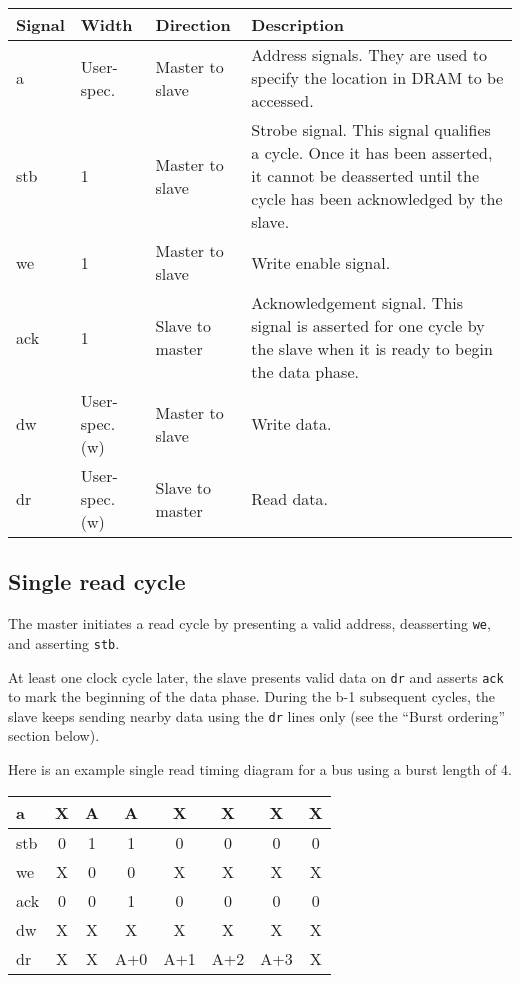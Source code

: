 \documentclass[a4paper,11pt]{article}
\begin{document}
\begin{tabularx}{\textwidth}{|l|l|l|X|}
\hline
\bf{Signal} & \bf{Width} & \bf{Direction} & \bf{Description} \\
\hline
a & User-spec. & Master to slave & Address signals. They are used to specify the location in DRAM to be accessed. \\
\hline
stb & 1 & Master to slave & Strobe signal. This signal qualifies a cycle. Once it has been asserted, it cannot be deasserted until the cycle has been acknowledged by the slave. \\
\hline
we & 1 & Master to slave & Write enable signal. \\
\hline
ack & 1 & Slave to master & Acknowledgement signal. This signal is asserted for one cycle by the slave when it is ready to begin the data phase. \\
\hline
dw & User-spec. (w) & Master to slave & Write data. \\
\hline
dr & User-spec. (w) & Slave to master & Read data. \\
\hline
\end{tabularx}

\subsection{Single read cycle}
The master initiates a read cycle by presenting a valid address, deasserting \verb!we!, and asserting \verb!stb!.

At least one clock cycle later, the slave presents valid data on \verb!dr! and asserts \verb!ack! to mark the beginning of the data phase. During the b-1 subsequent cycles, the slave keeps sending nearby data using the \verb!dr! lines only (see the ``Burst ordering'' section below).

Here is an example single read timing diagram for a bus using a burst length of 4.

\begin{tabular}{|l|c|c|c|c|c|c|c|}
\hline
a & X & A & A & X & X & X & X \\
\hline
stb & 0 & 1 & 1 & 0 & 0 & 0 & 0 \\
\hline
we & X & 0 & 0 & X & X & X & X \\
\hline
ack & 0 & 0 & 1 & 0 & 0 & 0 & 0 \\
\hline
dw & X & X & X & X & X & X & X \\
\hline
dr & X & X & A+0 & A+1 & A+2 & A+3 & X \\
\hline
\end{tabular}
\end{document}
